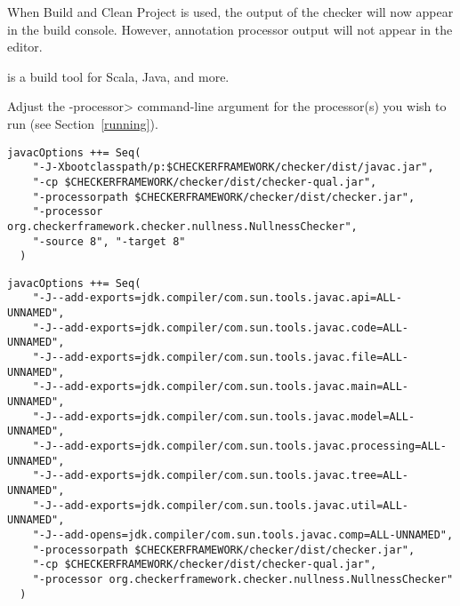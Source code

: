 \begin{enumerate}
When Build and Clean Project is used, the output of the checker will
now appear in the build console. However, annotation processor output
will not appear in the editor.

\end{enumerate}



 is a build tool for
Scala, Java, and more.

Adjust the \<-processor> command-line argument for the processor(s)
you wish to run (see Section~\ref{running}).



\begin{Verbatim}
javacOptions ++= Seq(
    "-J-Xbootclasspath/p:$CHECKERFRAMEWORK/checker/dist/javac.jar",
    "-cp $CHECKERFRAMEWORK/checker/dist/checker-qual.jar",
    "-processorpath $CHECKERFRAMEWORK/checker/dist/checker.jar",
    "-processor org.checkerframework.checker.nullness.NullnessChecker",
    "-source 8", "-target 8"
  )
\end{Verbatim}



\begin{Verbatim}
javacOptions ++= Seq(
    "-J--add-exports=jdk.compiler/com.sun.tools.javac.api=ALL-UNNAMED",
    "-J--add-exports=jdk.compiler/com.sun.tools.javac.code=ALL-UNNAMED",
    "-J--add-exports=jdk.compiler/com.sun.tools.javac.file=ALL-UNNAMED",
    "-J--add-exports=jdk.compiler/com.sun.tools.javac.main=ALL-UNNAMED",
    "-J--add-exports=jdk.compiler/com.sun.tools.javac.model=ALL-UNNAMED",
    "-J--add-exports=jdk.compiler/com.sun.tools.javac.processing=ALL-UNNAMED",
    "-J--add-exports=jdk.compiler/com.sun.tools.javac.tree=ALL-UNNAMED",
    "-J--add-exports=jdk.compiler/com.sun.tools.javac.util=ALL-UNNAMED",
    "-J--add-opens=jdk.compiler/com.sun.tools.javac.comp=ALL-UNNAMED",
    "-processorpath $CHECKERFRAMEWORK/checker/dist/checker.jar",
    "-cp $CHECKERFRAMEWORK/checker/dist/checker-qual.jar",
    "-processor org.checkerframework.checker.nullness.NullnessChecker"
  )
\end{Verbatim}


